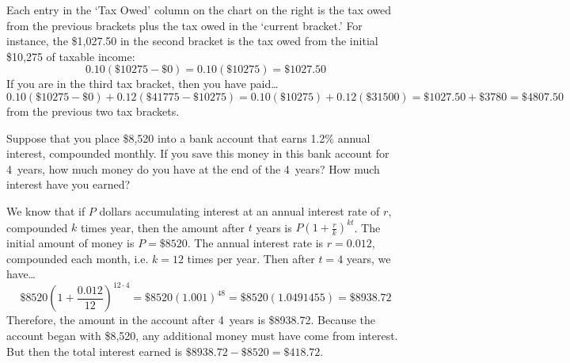 \documentclass[11pt,letterpaper]{article}
\begin{document}
\sol Each entry in the `Tax Owed' column on the chart on the right is the tax owed from the previous brackets plus the tax owed in the `current bracket.' For instance, the \$1,027.50 in the second bracket is the tax owed from the initial \$10,275 of taxable income:
	\[
	0.10(\$10275 - \$0)= 0.10(\$10275)= \$1027.50
	\]
If you are in the third tax bracket, then you have paid\dots
	\[
	0.10(\$10275 - \$0) + 0.12(\$41775 - \$10275)= 0.10(\$10275) + 0.12(\$31500)= \$1027.50 + \$3780= \$4807.50
	\]
from the previous two tax brackets. 



\newpage



 Suppose that you place \$8,520 into a bank account that earns 1.2\% annual interest, compounded monthly. If you save this money in this bank account for 4~years, how much money do you have at the end of the 4~years? How much interest have you earned? \pspace

\sol We know that if $P$ dollars accumulating interest at an annual interest rate of $r$, compounded $k$ times year, then the amount after $t$ years is $P \left(1 + \frac{r}{k} \right)^{kt}$. The initial amount of money is $P= \$8520$. The annual interest rate is $r= 0.012$, compounded each month, i.e. $k= 12$ times per year. Then after $t= 4$ years, we have\dots
	\[
	\$8520 \left(1 + \dfrac{0.012}{12} \right)^{12 \cdot 4}= \$8520 (1.001)^{48}= \$8520(1.0491455)= \$8938.72
	\]
Therefore, the amount in the account after 4~years is \$8938.72. Because the account began with \$8,520, any additional money must have come from interest. But then the total interest earned is $\$8938.72 - \$8520= \$418.72$. 
\end{document}
